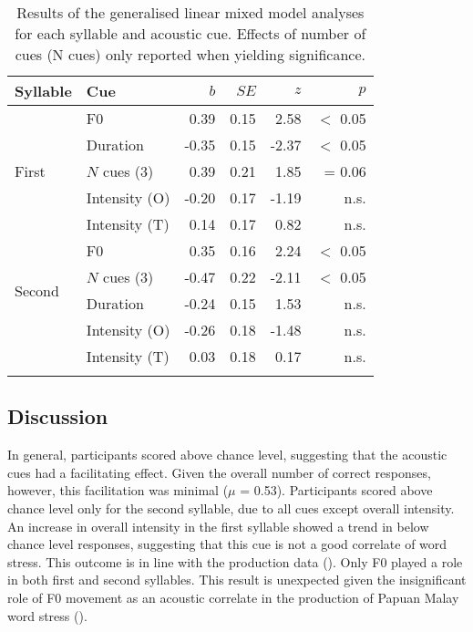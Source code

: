 \begin{table}
\caption{Results of the generalised linear mixed model analyses for
each syllable and acoustic cue. Effects of number of cues (N cues) only
reported when yielding significance.}
\label{tab33}
\begin{center}
\begin{tabularx}{0.9\textwidth}{p{1.5cm}p{3cm}rrrr}
\lsptoprule
 Syllable & Cue & $b$ & $SE$ & $z$ & $p$\\
\midrule
 \multirow{5}{*}{First} & F0 & 0.39 & 0.15 & 2.58 & $<$ 0.05\\
 & Duration & -0.35 & 0.15 & -2.37 & $<$ 0.05\\
 & $N$ cues (3) & 0.39 & 0.21 & 1.85 & = 0.06\\
 & Intensity (O) & -0.20 & 0.17 & -1.19 & n.s.\\
 & Intensity (T) & 0.14 & 0.17 & 0.82 & n.s.\\
\midrule
 \multirow{4}{*}{Second} & F0 & 0.35 & 0.16 & 2.24 & $<$ 0.05\\
 & $N$ cues (3) & -0.47 & 0.22 & -2.11 & $<$ 0.05\\
 & Duration & -0.24 & 0.15 & 1.53 & n.s.\\
 & Intensity (O) & -0.26 & 0.18 & -1.48 & n.s.\\
 & Intensity (T) & 0.03 & 0.18 & 0.17 & n.s.\\
\lspbottomrule
\end{tabularx}
\end{center}
\end{table}

\subsection{Discussion} \label{sec328}
In general, participants scored above chance level, suggesting that the acoustic cues had a facilitating effect. Given the overall number of correct responses, however, this facilitation was minimal ($\mu$ = 0.53). Participants scored above chance level only for the second syllable, due to all cues except overall intensity. An increase in overall intensity in the first syllable showed a trend in below chance level responses, suggesting that this cue is not a good correlate of word stress. This outcome is in line with the production data (). Only F0 played a role in both first and second syllables. This result is unexpected given the insignificant role of F0 movement as an acoustic correlate in the production of Papuan Malay word stress ().

